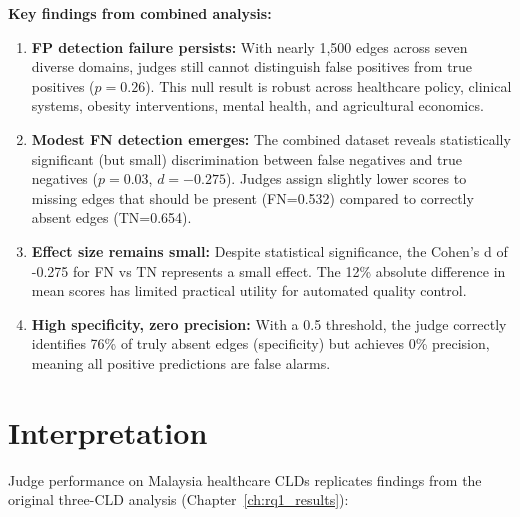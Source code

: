 \textbf{Key findings from combined analysis:}
\begin{enumerate}
    \item \textbf{FP detection failure persists:} With nearly 1,500 edges across seven diverse domains, judges still cannot distinguish false positives from true positives ($p=0.26$). This null result is robust across healthcare policy, clinical systems, obesity interventions, mental health, and agricultural economics.
    
    \item \textbf{Modest FN detection emerges:} The combined dataset reveals statistically significant (but small) discrimination between false negatives and true negatives ($p=0.03$, $d=-0.275$). Judges assign slightly lower scores to missing edges that should be present (FN=0.532) compared to correctly absent edges (TN=0.654).
    
    \item \textbf{Effect size remains small:} Despite statistical significance, the Cohen's d of -0.275 for FN vs TN represents a small effect. The 12\% absolute difference in mean scores has limited practical utility for automated quality control.
    
    \item \textbf{High specificity, zero precision:} With a 0.5 threshold, the judge correctly identifies 76\% of truly absent edges (specificity) but achieves 0\% precision, meaning all positive predictions are false alarms.
\end{enumerate}

\section{Interpretation}

Judge performance on Malaysia healthcare CLDs replicates findings from the original three-CLD analysis (Chapter~\ref{ch:rq1_results}):

